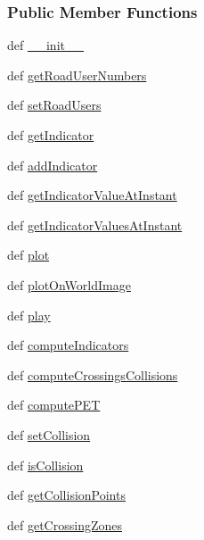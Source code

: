 \subsubsection*{Public Member Functions}
\begin{DoxyCompactItemize}
\item 
def \hyperlink{classevents_1_1Interaction_a37d41fbb1e5ce875dbc6c02f3a9d779c}{\-\_\-\-\_\-init\-\_\-\-\_\-}
\item 
def \hyperlink{classevents_1_1Interaction_a36254aa076f56784f9d48c08b6d48754}{get\-Road\-User\-Numbers}
\item 
def \hyperlink{classevents_1_1Interaction_a12448cfb45e896ab1c63aadbc61d2d9e}{set\-Road\-Users}
\item 
def \hyperlink{classevents_1_1Interaction_aa2e48b903c06f68adcde188f19155836}{get\-Indicator}
\item 
def \hyperlink{classevents_1_1Interaction_a3d1a455dc3f234458006f169ede1fafb}{add\-Indicator}
\item 
def \hyperlink{classevents_1_1Interaction_a3807a9d1f7a2bcc647855a2b8220c321}{get\-Indicator\-Value\-At\-Instant}
\item 
def \hyperlink{classevents_1_1Interaction_adb1c68b44b3ad0f002b4c4c4f2ac1411}{get\-Indicator\-Values\-At\-Instant}
\item 
def \hyperlink{classevents_1_1Interaction_a9639481ee2d4c7f9df61b24ca1402db8}{plot}
\item 
def \hyperlink{classevents_1_1Interaction_a6dfc8dd7cf05006aae65c13cd92c143e}{plot\-On\-World\-Image}
\item 
def \hyperlink{classevents_1_1Interaction_a49cbcbcec2428d0192974da932521821}{play}
\item 
def \hyperlink{classevents_1_1Interaction_a88bd165a8d768cbcf5aa599bd2595745}{compute\-Indicators}
\item 
def \hyperlink{classevents_1_1Interaction_a124a52882242e2fe699d9200e7fcd5c7}{compute\-Crossings\-Collisions}
\item 
def \hyperlink{classevents_1_1Interaction_a27e9ec43d8dc83490624669bea0db810}{compute\-P\-E\-T}
\item 
def \hyperlink{classevents_1_1Interaction_a4c4a705ecb073cf6d3e26fa433d0522b}{set\-Collision}
\item 
def \hyperlink{classevents_1_1Interaction_a5f8a88ad27c73937bcdc9935435c5e34}{is\-Collision}
\item 
def \hyperlink{classevents_1_1Interaction_a54d2c75ee1f805438ccf5427908c0e99}{get\-Collision\-Points}
\item 
def \hyperlink{classevents_1_1Interaction_a49ae1e32f056c6404678ca0ec5ee09b4}{get\-Crossing\-Zones}
\end{DoxyCompactItemize}
